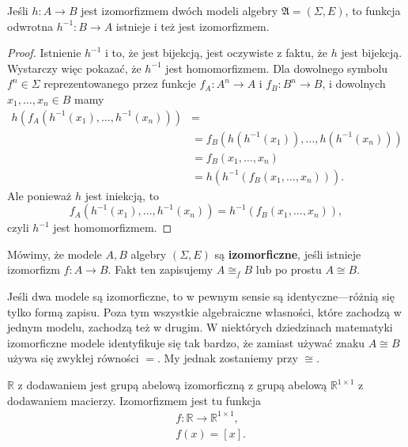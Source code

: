 \begin{lemma}
	Jeśli $h: A \to B$ jest izomorfizmem dwóch modeli algebry $\mathfrak{A} = (\Sigma, E)$,
		to funkcja odwrotna $h^{-1}: B \to A$ istnieje i też jest izomorfizmem.
\end{lemma}
\begin{proof}
	Istnienie $h^{-1}$ i to,
		że jest bijekcją,
		jest oczywiste z faktu,
		że $h$ jest bijekcją.
	Wystarczy więc pokazać,
		że $h^{-1}$ jest homomorfizmem.
	Dla dowolnego symbolu $f^n \in \Sigma$ reprezentowanego przez funkcje
		$f_A: A^n \to A$ i $f_B: B^n \to B$,
		i dowolnych $x_1, \dots, x_n \in B$ mamy
	\begin{align}
		h(f_A(h^{-1}(x_1), \dots, h^{-1}(x_n))) &= \\
			&= f_B(h(h^{-1}(x_1)), \dots, h(h^{-1}(x_n))) \\
			&= f_B(x_1, \dots, x_n) \\
			&= h(h^{-1}(f_B(x_1, \dots, x_n))).
	\end{align}
	Ale ponieważ $h$ jest iniekcją, to
	\begin{equation}
		f_A(h^{-1}(x_1), \dots, h^{-1}(x_n)) = h^{-1}(f_B(x_1, \dots, x_n)),
	\end{equation}
	czyli $h^{-1}$ jest homomorfizmem.
\end{proof}

\begin{definition}
	Mówimy, że modele $A, B$ algebry $(\Sigma, E)$ są \textbf{izomorficzne},
		jeśli istnieje izomorfizm $f: A \to B$.
	Fakt ten zapisujemy $A \cong_f B$ lub po prostu $A \cong B$.
\end{definition}
Jeśli dwa modele są izomorficzne, to w pewnym sensie są identyczne---różnią się tylko formą zapisu.
Poza tym wszystkie algebraiczne własności,
	które zachodzą w jednym modelu,
	zachodzą też w drugim.
W niektórych dziedzinach matematyki izomorficzne modele identyfikuje się tak bardzo,
	że zamiast używać znaku $A \cong B$ używa się zwykłej równości $=$.
My jednak zostaniemy przy $\cong$.

\begin{example}
	$\mathbb{R}$ z dodawaniem jest grupą abelową izomorficzną z grupą abelową $\mathbb{R}^{1 \times 1}$ z dodawaniem macierzy.
	Izomorfizmem jest tu funkcja
	\begin{align*}
		&f: \mathbb{R} \to \mathbb{R}^{1 \times 1},\\
		&f(x) = [x].
	\end{align*}
\end{example}

